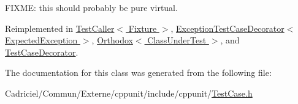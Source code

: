 F\-I\-X\-M\-E\-: this should probably be pure virtual. 



Reimplemented in \hyperlink{class_test_caller_aad0c877a47b75d056a4f8f323d3169ab}{Test\-Caller$<$ Fixture $>$}, \hyperlink{class_exception_test_case_decorator_a3f78294d459a94f55413162d814f291d}{Exception\-Test\-Case\-Decorator$<$ Expected\-Exception $>$}, \hyperlink{class_orthodox_aaeaafea272fdce3b5b2f33882cb33d8c}{Orthodox$<$ Class\-Under\-Test $>$}, and \hyperlink{class_test_case_decorator_ad083ca55ff2e7f1f3f442364aa1dde66}{Test\-Case\-Decorator}.



The documentation for this class was generated from the following file\-:\begin{DoxyCompactItemize}
\item 
Cadriciel/\-Commun/\-Externe/cppunit/include/cppunit/\hyperlink{_test_case_8h}{Test\-Case.\-h}\end{DoxyCompactItemize}
